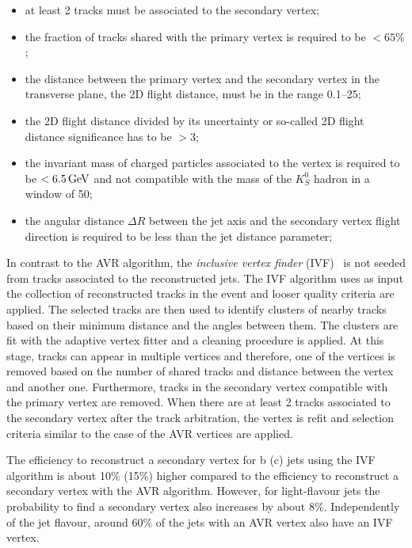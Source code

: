 \begin{itemize}
\item at least 2 tracks must be associated to the secondary vertex;
\item the fraction of tracks shared with the primary vertex is required to be $< 65\%$;
\item the distance between the primary vertex and the secondary vertex in the transverse plane, the 2D flight distance, must be in the range 0.1--25\mm;
\item the 2D flight distance divided by its uncertainty or so-called 2D flight distance significance has to be $> 3$;
\item the invariant mass of charged particles associated to the vertex is required to be $< 6.5\,\text{Ge\hspace{-.08em}V}$ and not compatible with the mass of the $K^0_S$ hadron in a window of 50\MeV;
\item the angular distance $\Delta R$ between the jet axis and the secondary vertex flight direction is required to be less than the jet distance parameter;
\end{itemize}

In contrast to the AVR algorithm, the \textit{inclusive vertex finder} (IVF)~\cite{Khachatryan:2011wq} is not seeded from tracks associated to the reconstructed jets. The IVF algorithm uses as input the collection of reconstructed tracks in the event and looser quality criteria are applied. The selected tracks are then used to identify clusters of nearby tracks based on their minimum distance and the angles between them. The clusters are fit with the adaptive vertex fitter and a cleaning procedure is applied. At this stage, tracks can appear in multiple vertices and therefore, one of the vertices is removed based on the number of shared tracks and distance between the vertex and another one. Furthermore, tracks in the secondary vertex compatible with the primary vertex are removed. When there are at least 2 tracks associated to the secondary vertex after the track arbitration, the vertex is refit and selection criteria similar to the case of the AVR vertices are applied.

 The efficiency to reconstruct a secondary vertex for b (c) jets using the IVF algorithm is about 10\% (15\%) higher compared to the efficiency to reconstruct a secondary vertex with the AVR algorithm. However, for light-flavour jets the probability to find a secondary vertex also increases by about 8\%. Independently of the jet flavour, around 60\% of the jets with an AVR vertex also have an IVF vertex.\\
 
